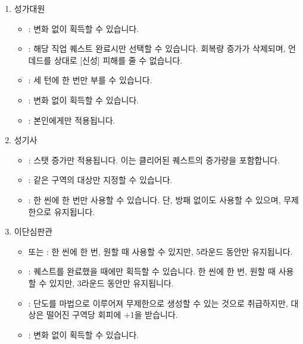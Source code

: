 \documentclass{report}
\begin{document}
		\begin{enumerate}
			\item 성가대원
				\begin{itemize}
					\item {}: 변화 없이 획득할 수 있습니다.
					\item {}: 해당 직업 퀘스트 완료시만 선택할 수 있습니다. 회복량 증가가 삭제되며, 언데드를 상대로 [신성] 피해를 줄 수 없습니다.
					\item {}: 세 턴에 한 번만 부를 수 있습니다.
					\item {}: 변화 없이 획득할 수 있습니다.
					\item {}: 본인에게만 적용됩니다.
				\end{itemize}
			\item 성기사
				\begin{itemize}
					\item {}: 스탯 증가만 적용됩니다. 이는 클리어된 퀘스트의 증가량을 포함합니다.
					\item {}: 같은 구역의 대상만 지정할 수 있습니다.
					\item {}: 한 씬에 한 번만 사용할 수 있습니다. 단, 방패 없이도 사용할 수 있으며, 무제한으로 유지됩니다.
				\end{itemize}
			\item 이단심판관
				\begin{itemize}
					\item {} 또는 : 한 씬에 한 번, 원할 때 사용할 수 있지만, 5라운드 동안만 유지됩니다.
					\item {}: 퀘스트를 완료했을 때에만 획득할 수 있습니다. 한 씬에 한 번, 원할 때 사용할 수 있지만, 3라운드 동안만 유지됩니다.
					\item {}: 단도를 마법으로 이루어져 무제한으로 생성할 수 있는 것으로 취급하지만, 대상은 떨어진 구역당 회피에 +1을 받습니다.
					\item {}: 변화 없이 획득할 수 있습니다.
				\end{itemize}
		\end{enumerate}
	
\end{document}
